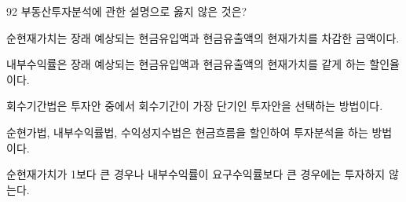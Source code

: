 \begin{question}{92}
부동산투자분석에 관한 설명으로 옳지 않은 것은?
\begin{choices}
  \item 순현재가치는 장래 예상되는 현금유입액과 현금유출액의 현재가치를 차감한 금액이다.
  \item 내부수익률은 장래 예상되는 현금유입액과 현금유출액의 현재가치를 같게 하는 할인율이다.
  \item 회수기간법은 투자안 중에서 회수기간이 가장 단기인 투자안을 선택하는 방법이다.
  \item 순현가법, 내부수익률법, 수익성지수법은 현금흐름을 할인하여 투자분석을 하는 방법이다.
  \item 순현재가치가 1보다 큰 경우나 내부수익률이 요구수익률보다 큰 경우에는 투자하지 않는다.
\end{choices}
\end{question}
